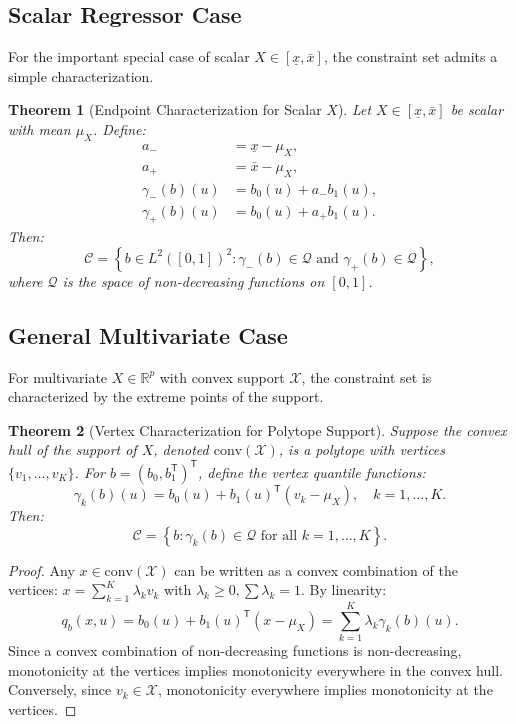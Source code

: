 \documentclass[12pt]{article}
\newcommand{\T}{\mathsf{T}}
\newcommand{\R}{\mathbb{R}}
\newcommand{\calQ}{\mathcal{Q}}
\newcommand{\xbar}{\underline{x}}
\newcommand{\xbaru}{\bar{x}}
\newtheorem{theorem}{Theorem}
\begin{document}
\subsection{Scalar Regressor Case}

For the important special case of scalar $X \in [\xbar, \xbaru]$, the constraint set admits a simple characterization.

\begin{theorem}[Endpoint Characterization for Scalar $X$]\label{thm:endpoint}
Let $X \in [\xbar, \xbaru]$ be scalar with mean $\mu_X$. Define:
\begin{align}
a_- &= \xbar - \mu_X, \\
a_+ &= \xbaru - \mu_X, \\
\gamma_-(b)(u) &= b_0(u) + a_- b_1(u), \\
\gamma_+(b)(u) &= b_0(u) + a_+ b_1(u).
\end{align}
Then:
\begin{equation}
\mathcal{C} = \left\{ b \in L^2([0,1])^2 : \gamma_-(b) \in \calQ \text{ and } \gamma_+(b) \in \calQ \right\},
\end{equation}
where $\calQ$ is the space of non-decreasing functions on $[0,1]$.
\end{theorem}

\subsection{General Multivariate Case}

For multivariate $X \in \R^p$ with convex support $\mathcal{X}$, the constraint set is characterized by the extreme points of the support.

\begin{theorem}[Vertex Characterization for Polytope Support]\label{thm:vertex}
Suppose the convex hull of the support of $X$, denoted $\text{conv}(\mathcal{X})$, is a polytope with vertices $\{v_1, \dots, v_K\}$. For $b = (b_0, b_1^\T)^\T$, define the vertex quantile functions:
\[
\gamma_k(b)(u) = b_0(u) + b_1(u)^\T (v_k - \mu_X), \quad k=1,\dots,K.
\]
Then:
\begin{equation}
\mathcal{C} = \left\{ b : \gamma_k(b) \in \calQ \text{ for all } k=1,\dots,K \right\}.
\end{equation}
\end{theorem}

\begin{proof}
Any $x \in \text{conv}(\mathcal{X})$ can be written as a convex combination of the vertices: $x = \sum_{k=1}^K \lambda_k v_k$ with $\lambda_k \geq 0, \sum \lambda_k = 1$. By linearity:
\[
q_b(x, u) = b_0(u) + b_1(u)^\T (x - \mu_X) = \sum_{k=1}^K \lambda_k \gamma_k(b)(u).
\]
Since a convex combination of non-decreasing functions is non-decreasing, monotonicity at the vertices implies monotonicity everywhere in the convex hull. Conversely, since $v_k \in \mathcal{X}$, monotonicity everywhere implies monotonicity at the vertices.
\end{proof}
\end{document}
